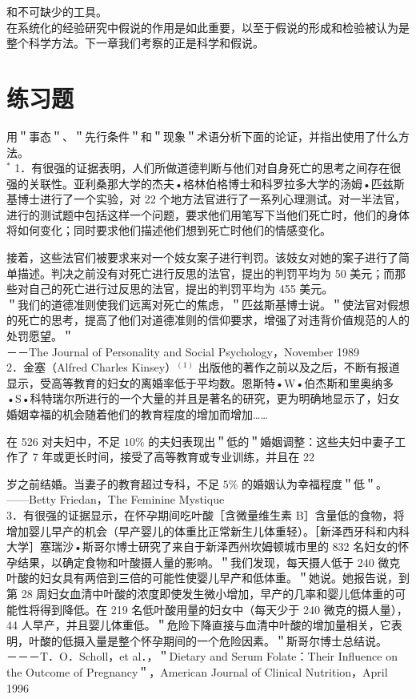 和不可缺少的工具。\\
在系统化的经验研究中假说的作用是如此重要，以至于假说的形成和检验被认为是整个科学方法。下一章我们考察的正是科学和假说。

\section*{练习题}
用＂事态＂、＂先行条件＂和＂现象＂术语分析下面的论证，并指出使用了什么方法。\\
${ }^{*}$ 1．有很强的证据表明，人们所做道德判断与他们对自身死亡的思考之间存在很强的关联性。亚利桑那大学的杰夫•格林伯格博士和科罗拉多大学的汤姆•匹兹斯基博士进行了一个实验，对 22 个地方法官进行了一系列心理测试。对一半法官，进行的测试题中包括这样一个问题，要求他们用笔写下当他们死亡时，他们的身体将如何变化；同时要求他们描述他们想到死亡时他们的情感变化。

接着，这些法官们被要求来对一个妓女案子进行判罚。该妓女对她的案子进行了简单描述。判决之前没有对死亡进行反思的法官，提出的判罚平均为 50 美元；而那些对自己的死亡进行过反思的法官，提出的判罚平均为 455 美元。\\
＂我们的道德准则使我们远离对死亡的焦虑，＂匹兹斯基博士说。＂使法官对假想的死亡的思考，提高了他们对道德准则的信仰要求，增强了对违背价值规范的人的处罚愿望。＂\\
－－The Journal of Personality and Social Psychology，November 1989\\
2．金塞（Alfred Charles Kinsey）${ }^{(1)}$ 出版他的著作之前以及之后，不断有报道显示，受高等教育的妇女的离婚率低于平均数。恩斯特•W•伯杰斯和里奥纳多•S•科特瑞尔所进行的一个大量的并且是著名的研究，更为明确地显示了，妇女婚姻幸福的机会随着他们的教育程度的增加而增加……

在 526 对夫妇中，不足 $10 \%$ 的夫妇表现出＂低的＂婚姻调整：这些夫妇中妻子工作了 7 年或更长时间，接受了高等教育或专业训练，并且在 22

岁之前结婚。当妻子的教育超过专科，不足 $5 \%$ 的婚姻认为幸福程度＂低＂。\\
——Betty Friedan，The Feminine Mystique\\
3．有很强的证据显示，在怀孕期间吃叶酸［含微量维生素 B］含量低的食物，将增加婴儿早产的机会（早产婴儿的体重比正常新生儿体重轻）。［新泽西牙科和内科大学］塞瑞沙•斯哥尔博士研究了来自于新泽西州坎姆顿城市里的 832 名妇女的怀孕结果，以确定食物和叶酸摄人量的影响。＂我们发现，每天摄人低于 240 微克叶酸的妇女具有两倍到三倍的可能性使婴儿早产和低体重。＂她说。她报告说，到第 28 周妇女血清中叶酸的浓度即使发生微小增加，早产的几率和婴儿低体重的可能性将得到降低。在 219 名低叶酸用量的妇女中（每天少于 240 微克的摄人量）， 44 人早产，并且婴儿体重低。＂危险下降直接与血清中叶酸的增加量相关，它表明，叶酸的低摄入量是整个怀孕期间的一个危险因素。＂斯哥尔博士总结说。\\
－－－T．O．Scholl，et al．，＂Dietary and Serum Folate：Their Influence on the Outcome of Pregnancy＂，American Journal of Clinical Nutrition，April 1996

